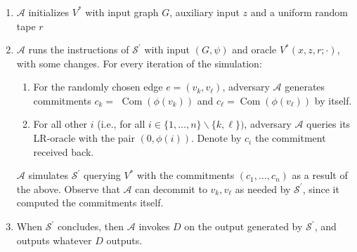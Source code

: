 \documentclass{beamer}
\begin{document}
    \begin{frame}
        \frametitle{}
        \begin{enumerate}
            \item $\mathcal{A}$ initializes $V^{*}$ with input graph $G$, auxiliary input $z$ and a uniform random tape $r$
            \item $\mathcal{A}$ runs the instructions of $\mathcal{S}^{\prime}$ with input $(G, \psi)$ and oracle $V^{*}(x, z, r ; \cdot)$, with some changes. 
            For every iteration of the simulation:
           \begin{enumerate}[a]
               \item For the randomly chosen edge $e=\left(v_{k}, v_{\ell}\right)$, adversary $\mathcal{A}$ generates commitments $c_{k}=$ $\operatorname{Com}\left(\phi\left(v_{k}\right)\right)$ and $c_{\ell}=\operatorname{Com}\left(\phi\left(v_{\ell}\right)\right)$ by itself.
               \item  For all other $i$ (i.e., for all $i \in\{1, \ldots, n\} \backslash\{k, \ell\})$, adversary $\mathcal{A}$ queries its LR-oracle with the pair $(0, \phi(i))$. Denote by $c_{i}$ the commitment received back.
           \end{enumerate}
           $\mathcal{A}$ simulates $\mathcal{S}^{\prime}$ querying $V^{*}$ with the commitments $\left(c_{1}, \ldots, c_{n}\right)$ as a result of the above. Observe that $\mathcal{A}$ can decommit to $v_{k}, v_{\ell}$ as needed by $\mathcal{S}^{\prime}$, since it computed the commitments itself.

           \item When $\mathcal{S}^{\prime}$ concludes, then $\mathcal{A}$ invokes $D$ on the output generated by $\mathcal{S}^{\prime}$, and outputs whatever $D$ outputs.
            
            
        \end{enumerate}
        
    
    \end{frame}
\end{document}
